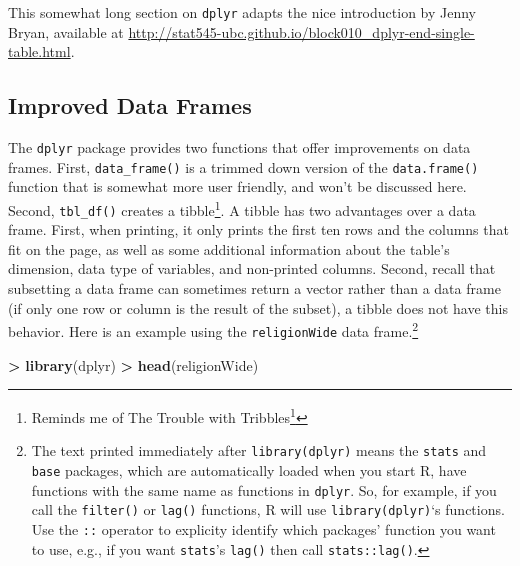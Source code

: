 \documentclass[]{krantz}
\makeatletter
\newenvironment{Shaded}{\begin{snugshade}}{\end{snugshade}}
\newcommand{\KeywordTok}[1]{\textcolor[rgb]{0.27,0.27,0.27}{\textbf{#1}}}
\newcommand{\NormalTok}[1]{#1}
\newcommand{\OperatorTok}[1]{\textcolor[rgb]{0.43,0.43,0.43}{\textbf{#1}}}
\newcommand{\StringTok}[1]{\textcolor[rgb]{0.5,0.5,0.5}{#1}}
\renewcommand{\href}[2]{#2\footnote{\url{#1}}}
\newenvironment{kframe}{%
\medskip{}
\setlength{\fboxsep}{.8em}
 \def\at@end@of@kframe{}%
 \ifinner\ifhmode%
  \def\at@end@of@kframe{\end{minipage}}%
  \begin{minipage}{\columnwidth}%
 \fi\fi%
 \def\FrameCommand##1{\hskip\@totalleftmargin \hskip-\fboxsep
 \colorbox{shadecolor}{##1}\hskip-\fboxsep
     \hskip-\linewidth \hskip-\@totalleftmargin \hskip\columnwidth}%
 \MakeFramed {\advance\hsize-\width
   \@totalleftmargin\z@ \linewidth\hsize
   \@setminipage}}%
 {\par\unskip\endMakeFramed%
 \at@end@of@kframe}
\renewenvironment{Shaded}{\begin{kframe}}{\end{kframe}}
\makeatother
\begin{document}
This somewhat long section on \texttt{dplyr} adapts the nice introduction by Jenny Bryan, available at \url{http://stat545-ubc.github.io/block010_dplyr-end-single-table.html}.

\hypertarget{improved-data-frames}{%
\subsection{Improved Data Frames}\label{improved-data-frames}}

The \texttt{dplyr} package provides two functions that offer improvements on data frames. First, \texttt{data\_frame()} is a trimmed down version of the \texttt{data.frame()} function that is somewhat more user friendly, and won't be discussed here. Second, \texttt{tbl\_df()} creates a tibble\footnote{Reminds me of \href{https://en.wikipedia.org/wiki/The_Trouble_with_Tribbles}{The Trouble with Tribbles}}. A tibble has two advantages over a data frame. First, when printing, it only prints the first ten rows and the columns that fit on the page, as well as some additional information about the table's dimension, data type of variables, and non-printed columns. Second, recall that subsetting a data frame can sometimes return a vector rather than a data frame (if only one row or column is the result of the subset), a tibble does not have this behavior. Here is an example using the \texttt{religionWide} data frame.\footnote{The text printed immediately after \texttt{library(dplyr)} means the \texttt{stats} and \texttt{base} packages, which are automatically loaded when you start R, have functions with the same name as functions in \texttt{dplyr}. So, for example, if you call the \texttt{filter()} or \texttt{lag()} functions, R will use \texttt{library(dplyr)}`s functions. Use the \texttt{::} operator to explicity identify which packages' function you want to use, e.g., if you want \texttt{stats}'s \texttt{lag()} then call \texttt{stats::lag()}.}

\begin{Shaded}
\begin{Highlighting}[]
\OperatorTok{>}\StringTok{ }\KeywordTok{library}\NormalTok{(dplyr)}
\OperatorTok{>}\StringTok{ }\KeywordTok{head}\NormalTok{(religionWide)}
\end{Highlighting}
\end{Shaded}
\end{document}
